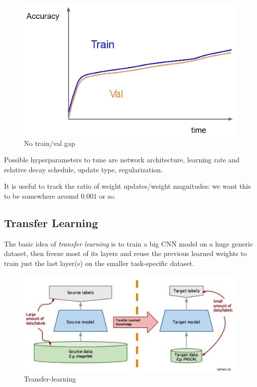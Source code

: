 \begin{minipage}{.3\linewidth}
    \begin{figure}[H]
        \centering
        \includegraphics[width=0.9\linewidth]{images/tnn-acc-3}
        \caption[No train/val gap]{No train/val gap}
        \label{fig:tnn-acc-3}
    \end{figure}
\end{minipage}

Possible hyperparameters to tune are network architecture, learning rate and relative decay schedule, update type, regularization.

It is useful to track the ratio of weight updates/weight magnitudes: we want this to be somewhere around 0.001 or so.


\subsection{Transfer Learning}\label{sec:tnn-transfer}

The basic idea of \textit{transfer learning} is to train a big CNN model on a huge generic dataset, then freeze most of its layers and reuse the previous learned weights to train just the last layer(s) on the smaller task-specific dataset.

\begin{figure}[h!]
    \centering
    \includegraphics[width=0.7\linewidth]{images/transfer-learning}
    \caption[Transfer-learning]{Transfer-learning}
    \label{fig:transfer-learning}
\end{figure}

